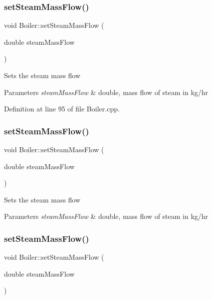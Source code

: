 \subsubsection{\texorpdfstring{set\+Steam\+Mass\+Flow()}{setSteamMassFlow()}\hspace{0.1cm}{\footnotesize\ttfamily [1/3]}}
{\footnotesize\ttfamily void Boiler\+::set\+Steam\+Mass\+Flow (\begin{DoxyParamCaption}\item[{double}]{steam\+Mass\+Flow }\end{DoxyParamCaption})}

Sets the steam mass flow 
\begin{DoxyParams}{Parameters}
{\em steam\+Mass\+Flow} & double, mass flow of steam in kg/hr \\
\hline
\end{DoxyParams}


Definition at line 95 of file Boiler.\+cpp.

\mbox{\label{class_boiler_ada7af5896a2a4701d78a532dc9bc9892}} 
\subsubsection{\texorpdfstring{set\+Steam\+Mass\+Flow()}{setSteamMassFlow()}\hspace{0.1cm}{\footnotesize\ttfamily [2/3]}}
{\footnotesize\ttfamily void Boiler\+::set\+Steam\+Mass\+Flow (\begin{DoxyParamCaption}\item[{double}]{steam\+Mass\+Flow }\end{DoxyParamCaption})}

Sets the steam mass flow 
\begin{DoxyParams}{Parameters}
{\em steam\+Mass\+Flow} & double, mass flow of steam in kg/hr \\
\hline
\end{DoxyParams}
\mbox{\label{class_boiler_ada7af5896a2a4701d78a532dc9bc9892}} 
\subsubsection{\texorpdfstring{set\+Steam\+Mass\+Flow()}{setSteamMassFlow()}\hspace{0.1cm}{\footnotesize\ttfamily [3/3]}}
{\footnotesize\ttfamily void Boiler\+::set\+Steam\+Mass\+Flow (\begin{DoxyParamCaption}\item[{double}]{steam\+Mass\+Flow }\end{DoxyParamCaption})}

